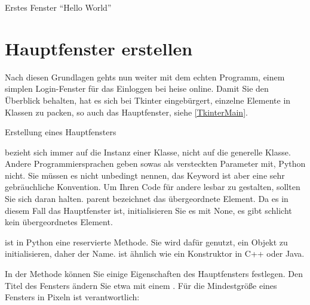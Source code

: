 \begin{code}
   
  \caption{Erstes Fenster  ``Hello World''}\label{TkinterHelloWorldCode}
\end{code}   

\section{Hauptfenster erstellen}

Nach diesen Grundlagen gehts nun weiter mit dem echten Programm, einem simplen Login-Fenster für das Einloggen bei heise online. Damit Sie den Überblick behalten, hat es sich bei Tkinter eingebürgert, einzelne Elemente in Klassen zu packen, so auch das Hauptfenster, siehe \ref{TkinterMain}.

\begin{code}
     
     
    \caption{Erstellung eines Hauptfensters}\label{TkinterMain}
\end{code}   




 bezieht sich immer auf die Instanz einer Klasse, nicht auf die generelle Klasse. Andere Programmiersprachen geben sowas als versteckten Parameter mit, Python nicht. Sie müssen es nicht unbedingt  nennen, das Keyword ist aber eine sehr gebräuchliche Konvention. Um Ihren Code für andere lesbar zu gestalten, sollten Sie sich daran halten. parent bezeichnet das übergeordnete Element. Da es in diesem Fall das Hauptfenster ist, initialisieren Sie es mit None, es gibt schlicht kein übergeordnetes Element.

 ist in Python eine reservierte Methode. Sie wird dafür genutzt, ein Objekt zu initialisieren, daher der Name.  ist ähnlich wie ein Konstruktor in C++ oder Java.

In der Methode  können Sie einige Eigenschaften des Hauptfensters festlegen. Den Titel des Fensters ändern Sie etwa mit einem . Für die Mindestgröße eines Fensters in Pixeln ist  verantwortlich:

\medskip


\medskip


